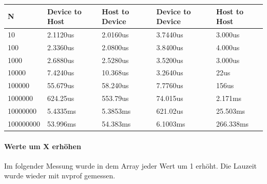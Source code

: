 \documentclass{article}
\begin{document}
\begin{center}
	\begin{tabular}{|l|l|l|l|l|}
		\hline
		N         & Device to Host     & Host to Device     & Device to Device     & Host to Host      \\ \hline \hline
		10			& 2.1120us & 2.0160us &  3.7440us & 3.000us \\ \hline
		100			& 2.3360us & 2.0800us  & 3.8400us & 4.000us\\ \hline
		1000	& 2.6880us & 2.5280us & 3.5200us & 3.000us \\ \hline 
		10000     & 7.4240us & 10.368us & 3.2640us & 22us      \\ \hline
		100000    & 55.679us & 58.240us & 7.7760us & 156us     \\ \hline
		1000000   & 624.25us & 553.79us & 74.015us & 2.171ms   \\ \hline
		10000000  & 5.4335ms & 5.3853ms & 621.02us & 25.503ms  \\ \hline
		100000000 & 53.996ms & 54.383ms & 6.1003ms & 266.338ms \\ \hline
	\end{tabular}
\end{center}

\paragraph{Werte um X erhöhen} Im folgender Messung wurde in dem Array jeder Wert um 1 erhöht. Die Lauzeit wurde wieder mit nvprof gemessen. 
\end{document}
